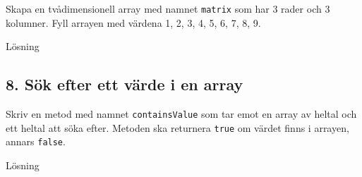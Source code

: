 Skapa en tvådimensionell array med namnet \texttt{matrix} som har 3
rader och 3 kolumner. Fyll arrayen med värdena 1, 2, 3, 4, 5, 6, 7, 8,
9.

Lösning

\hypertarget{cb6}{}
\begin{Shaded}
\begin{Highlighting}[]
\OperatorTok{[][]}\OperatorTok{=} \OperatorTok{\{}
    \OperatorTok{\{}\OperatorTok{,} \OperatorTok{,} \OperatorTok{\},}
    \OperatorTok{\{}\OperatorTok{,} \OperatorTok{,} \OperatorTok{\},}
    \OperatorTok{\{}\OperatorTok{,} \OperatorTok{,} \OperatorTok{\}\};}
\end{Highlighting}
\end{Shaded}

\hypertarget{suxf6k-efter-ett-vuxe4rde-i-en-array}{%
\subsection{8. Sök efter ett värde i en
array}\label{suxf6k-efter-ett-vuxe4rde-i-en-array}}

Skriv en metod med namnet \texttt{containsValue} som tar emot en array
av heltal och ett heltal att söka efter. Metoden ska returnera
\texttt{true} om värdet finns i arrayen, annars \texttt{false}.

Lösning

\hypertarget{cb7}{}
\begin{Shaded}
\begin{Highlighting}[]
   \OperatorTok{(}\OperatorTok{[]}\OperatorTok{,} \OperatorTok{)} \OperatorTok{\{}
     \OperatorTok{(}\OperatorTok{=} \OperatorTok{;}\OperatorTok{\textless{}}\OperatorTok{;}\OperatorTok{++)} \OperatorTok{\{}
         \OperatorTok{(}\OperatorTok{[}\OperatorTok{]} \OperatorTok{==}\OperatorTok{)} \OperatorTok{\{}
             \OperatorTok{;}
        \OperatorTok{\}}
    \OperatorTok{\}}
     \OperatorTok{;}
\OperatorTok{\}}
\end{Highlighting}
\end{Shaded}

